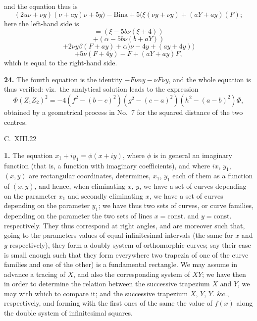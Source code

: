 \documentclass[11pt,a4paper]{book}
\begin{document}
and the equation thus is
\[
(2u\nu + \nu y)(\nu + a y)\nu + 5 y) - \text{Bina} + 5(\xi(\nu y + \nu y) + (a Y + a y)(F);
\]
here the left-hand side is
\[
= (\xi - 5b\nu(\xi + 4))
\]
\[
+ (\alpha - 5b\nu(b + a Y))
\]
\[
+ 2\nu y\beta(F + a y) + \alpha)\nu - 4y + (a y + 4y))
\]
\[
+ 5\nu(F + 4y) - F + (a Y + a y)F,
\]
which is equal to the right-hand side.

\textbf{24.} The fourth equation is the identity $- F\nu n y - \nu F\nu y$, and the whole equation is thus verified: viz.\ the analytical solution leads to the expression
\[
\Phi (Z_1 Z_2)^2 = - 4 (f^2 - (b - c)^2) (g^2 - (c - a)^2) (h^2 - (a - b)^2) \Phi,
\]
obtained by a geometrical process in No.\ 7 for the squared distance of the two centres.

\hspace*{\fill} C.\ XIII.\hfill 22

\newpage
{}

\textbf{1.} The equation $x_1 + iy_1 = \phi (x + iy)$, where $\phi$ is in general an imaginary function (that is, a function with imaginary coefficients), and where $ix$, $y_1$, $(x, y)$ are rectangular coordinates, determines, $x_1$, $y_1$ each of them as a function of $(x, y)$, and hence, when eliminating $x$, $y$, we have a set of curves depending on the parameter $x_1$ and secondly eliminating $x$, we have a set of curves depending on the parameter $y_1$; we have thus two sets of curves, or curve families, depending on the parameter the two sets of lines $x = \text{const.}$ and $y = \text{const.}$ respectively. They thus correspond at right angles, and are moreover such that, going to the parameters values of equal infinitesimal intervals (the same for $x$ and $y$ respectively), they form a doubly system of orthomorphic curves; say their case is small enough such that they form everywhere two trapezia of one of the curve families and one of the other) is a fundamental rectangle. We may assume in advance a tracing of $X$, and also the corresponding system of $XY$; we have then in order to determine the relation between the successive trapezium $X$ and $Y$, we may with which to compare it; and the successive trapezium $X$, $Y$, $Y$. \&c., respectively, and forming with the first ones of the same the value of $f(x)$ along the double system of infinitesimal squares.
\end{document}
